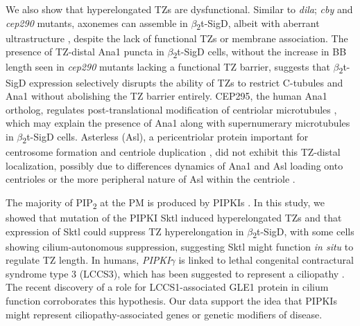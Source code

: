 \documentclass[12pt, twoside, letterpaper]{article}
\newcommand{\PIP}{PIP\textsubscript{2}}
\newcommand{\sigd}{$\beta$\textsubscript{2}t-SigD}
\begin{document}
\begin{doublespacing}
\begin{linenumbers}
    We also show that hyperelongated TZs are dysfunctional.
    Similar to \textit{dila}; \textit{cby} \citep{vieillard2016transition} and
    \textit{cep290} \citep{basiri2014migrating}
    mutants, axonemes can assemble in \sigd{}, albeit
    with aberrant ultrastructure
    \citep{wei2008depletion}, despite the lack of functional TZs
    or membrane association.
    The presence of TZ-distal Ana1 puncta in \sigd{} cells, without the increase
    in BB length seen in \textit{cep290} mutants lacking a functional TZ barrier,
    suggests that \sigd{} expression selectively disrupts the ability of TZs to restrict C-tubules and
    Ana1 without abolishing the TZ barrier entirely.
    CEP295, the human Ana1 ortholog, regulates
    post-translational modification of centriolar
    microtubules \citep{chang2016cep295}, which may explain the presence of Ana1 along with
    supernumerary microtubules in \sigd{} cells.
    Asterless (Asl), a pericentriolar protein
    important for centrosome formation and centriole duplication
    \citep{blachon2008drosophila, dzhindzhev2010asterless}, did not
    exhibit this TZ-distal localization, possibly due to differences dynamics of Ana1 and Asl
    loading onto centrioles \citep{fu2016conserved, saurya2016drosophila} or the
    more peripheral nature of Asl within the centriole \citep{blachon2008drosophila}.

    The majority of \PIP{} at the PM is produced by PIPKIs
    \citep{balla2013phosphoinositides, hammond2012pi4p}.
    In this study, we showed that mutation of the PIPKI Sktl
    induced hyperelongated TZs
    and that expression of Sktl could suppress TZ hyperelongation in \sigd{},
    with some cells showing cilium-autonomous suppression,
    suggesting Sktl might function \textit{in situ} to regulate TZ length.
    In humans, \textit{PIPKI$\gamma$} is linked to lethal congenital contractural
    syndrome type 3 (LCCS3), which has been suggested to represent a ciliopathy
    \citep{xu2016phosphatidylinositol}.
    The recent discovery of a role for LCCS1-associated GLE1 protein in cilium
    function \citep{jao2017role} corroborates this hypothesis.
    Our data support the idea that PIPKIs might represent ciliopathy-associated genes
    or genetic modifiers of disease.


\end{linenumbers}
\end{doublespacing}
\end{document}
